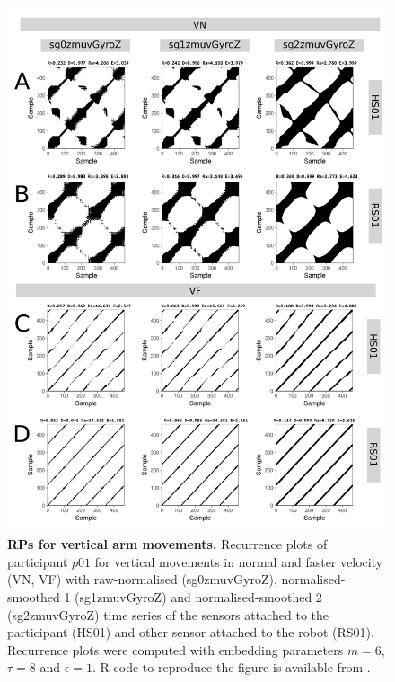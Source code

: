\begin{figure}
\centering
\includegraphics[height=0.85\textheight]{rp_aV}
\caption{
	{\bf RPs for vertical arm movements.}	
	Recurrence plots %
	of participant $p01$ for vertical movements in normal and faster 
	velocity (VN, VF) with raw-normalised (sg0zmuvGyroZ), 
	normalised-smoothed 1 (sg1zmuvGyroZ) and 
	normalised-smoothed 2 (sg2zmuvGyroZ) time series of the 
	sensors attached to the participant (HS01) and other sensor 
	attached to the robot (RS01).
	Recurrence plots were computed with 
	embedding parameters $m=6$, $\tau=8$ and $\epsilon=1$.
	R code to reproduce the figure is available from \cite{hwum2018}.
        }
    \label{fig:rp_aV}
\end{figure}




\newpage
